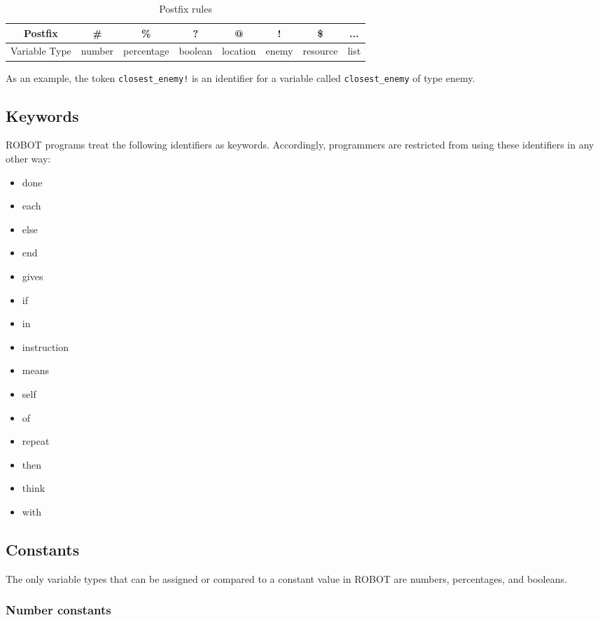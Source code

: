 \documentclass[a4paper]{article}
\begin{document}
\begin{table}[h!]
	\centering
	\begin{tabular}{|c|c|c|c|c|c|c|c|}
		\hline
		Postfix & \# & \% & ? & @ & ! & \$ & ...\\
		\hline
		Variable Type & number & percentage & boolean & location & enemy & resource & list\\
		\hline
	\end{tabular}
	\caption{Postfix rules}
\end{table}

As an example, the token \texttt{closest\_enemy!} is an identifier for a variable called \texttt{closest\_enemy} of type enemy.

\subsection{Keywords}

ROBOT programs treat the following identifiers as keywords.  Accordingly, programmers are restricted from using these identifiers in any other way:
\begin{itemize}
	\item done
	\item each
	\item else
	\item end
	\item gives
	\item if
	\item in
	\item instruction
	\item means
	\item self
	\item of
	\item repeat
	\item then
	\item think
	\item with
\end{itemize}

\subsection{Constants}

The only variable types that can be assigned or compared to a constant value in ROBOT are numbers, percentages, and booleans.

\subsubsection{Number constants}
\end{document}
